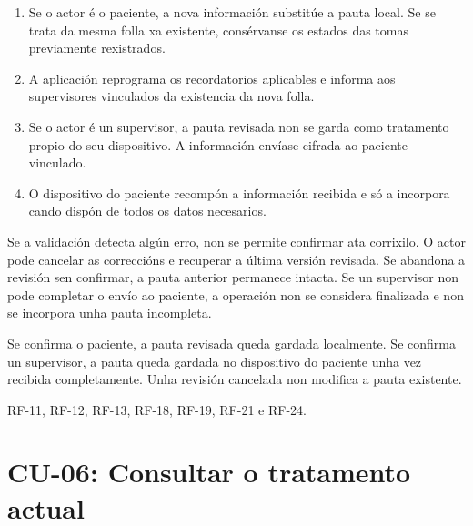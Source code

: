 \begin{description}
\begin{enumerate}
    \item Se o actor é o paciente, a nova información substitúe a pauta local. Se se trata da mesma folla
    xa existente, consérvanse os estados das tomas previamente rexistrados.

    \item A aplicación reprograma os recordatorios aplicables e informa aos
    supervisores vinculados da existencia da nova folla.

    \item Se o actor é un supervisor, a pauta revisada non se garda como
    tratamento propio do seu dispositivo. A información envíase cifrada ao
    paciente vinculado.

    \item O dispositivo do paciente recompón a información recibida e só a
    incorpora cando dispón de todos os datos necesarios.
\end{enumerate}

\item[Fluxos alternativos:] Se a validación detecta algún erro, non se permite
confirmar ata corrixilo. O actor pode cancelar as correccións e recuperar a
última versión revisada. Se abandona a revisión sen confirmar, a pauta anterior
permanece intacta. Se un supervisor non pode completar o envío ao paciente, a
operación non se considera finalizada e non se incorpora unha pauta incompleta.

\item[Postcondicións:] Se confirma o paciente, a pauta revisada queda gardada
localmente. Se confirma un supervisor, a pauta queda gardada no dispositivo do
paciente unha vez recibida completamente. Unha revisión cancelada non modifica
a pauta existente.

\item[Requisitos relacionados:] RF-11, RF-12, RF-13, RF-18, RF-19, RF-21 e
RF-24.

\end{description}



\section{CU-06: Consultar o tratamento actual}
\label{cu:consultar-tratamento}

